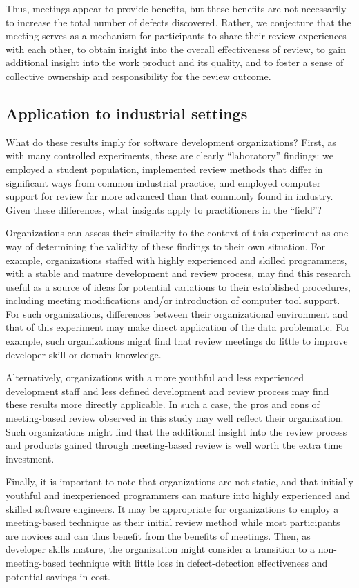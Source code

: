 Thus, meetings appear to provide benefits, but these benefits are not
necessarily to increase the total number of defects discovered.  Rather, we
conjecture that the meeting serves as a mechanism for participants to share
their review experiences with each other, to obtain insight into the
overall effectiveness of review, to gain additional insight into the work
product and its quality, and to foster a sense of collective ownership and
responsibility for the review outcome.

\subsection{Application to industrial settings}

What do these results imply for software development organizations?  First,
as with many controlled experiments, these are clearly ``laboratory''
findings: we employed a student population, implemented review methods that
differ in significant ways from common industrial practice, and employed
computer support for review far more advanced than that commonly found in
industry. Given these differences, what insights apply to practitioners in
the ``field''?

Organizations can assess their similarity to the context of this experiment
as one way of determining the validity of these findings to their own
situation.  For example, organizations staffed with highly experienced and
skilled programmers, with a stable and mature development and review
process, may find this research useful as a source of ideas for potential
variations to their established procedures, including meeting modifications
and/or introduction of computer tool support. For such organizations,
differences between their organizational environment and that of this
experiment may make direct application of the data problematic. For
example, such organizations might find that review meetings do little to improve
developer skill or domain knowledge.

Alternatively, organizations with a more youthful and less experienced
development staff and less defined development and review process may find
these results more directly applicable.  In such a case, the pros and cons
of meeting-based review observed in this study may well reflect their
organization. Such organizations might find that the additional insight
into the review process and products gained through meeting-based review is
well worth the extra time investment.

Finally, it is important to note that organizations are not static, and
that initially youthful and inexperienced programmers can mature into
highly experienced and skilled software engineers.  It may be appropriate
for organizations to employ a meeting-based technique as their initial
review method while most participants are novices and can thus benefit from
the benefits of meetings.  Then, as developer skills mature, the
organization might consider a transition to a non-meeting-based technique
with little loss in defect-detection effectiveness and potential savings in
cost.

